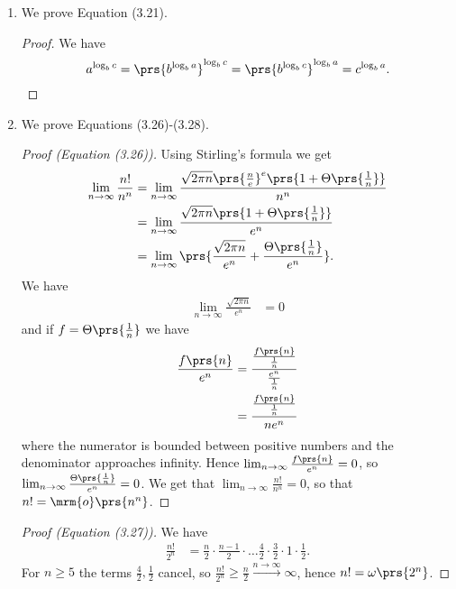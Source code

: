\documentclass[oneside]{scrbook}
\theoremstyle{definition}
\begin{document}
\begin{exercise}
    \begin{enumerate}[label = \alph*.]
        \item We prove Equation (3.21).

        \begin{proof}
            We have
            \[a^{\log_b c} = \prs{b^{\log_b a}}^{\log_b c} = \prs{b^{\log_b c}}^{\log_b a} = c^{\log_b a} \text{.}\]
        \end{proof}

        \item We prove Equations (3.26)-(3.28).

        \begin{proof}[Proof (Equation (3.26))]
            Using Stirling's formula we get
            \begin{align*}
                \lim_{n\to\infty} \frac{n!}{n^n}
                &=
                \lim_{n\to\infty} \frac{\sqrt{2 \pi n} \prs{\frac{n}{e}}^e \prs{1 + \Theta\prs{\frac{1}{n}}}}{n^n}
                \\
                &=
                \lim_{n\to\infty} \frac{\sqrt{2 \pi n} \prs{1 + \Theta\prs{\frac{1}{n}}}}{e^n}
                \\&=
                \lim_{n\to\infty} \prs{\frac{\sqrt{2 \pi n}}{e^n} + \frac{\Theta\prs{\frac{1}{n}}}{e^n}} \text{.}
            \end{align*}
            We have
            \begin{align*}
                \lim_{n\to\infty} \frac{\sqrt{2 \pi n}}{e^n} &= 0
            \end{align*}
            and if $f = \Theta\prs{\frac{1}{n}}$ we have
            \begin{align*}
                \frac{f\prs{n}}{e^n} &= \frac{\frac{f\prs{n}}{\frac{1}{n}}}{\frac{e^n}{\frac{1}{n}}}
                \\&=
                \frac{\frac{f\prs{n}}{\frac{1}{n}}}{n e^n}
            \end{align*}
            where the numerator is bounded between positive numbers and the denominator approaches infinity. Hence $\lim_{n\to\infty} \frac{f\prs{n}}{e^n} = 0$, so $\lim_{n\to\infty} \frac{\Theta\prs{\frac{1}{n}}}{e^n} = 0$.
            We get that
            $\lim_{n\to\infty} \frac{n!}{n^n} = 0$, so that $n! = \mrm{o}\prs{n^n}$.
        \end{proof}

        \begin{proof}[Proof (Equation (3.27))]
            We have
            \begin{align*}
                \frac{n!}{2^n} &= \frac{n}{2} \cdot \frac{n-1}{2} \cdot \ldots \frac{4}{2} \cdot \frac{3}{2} \cdot 1 \cdot \frac{1}{2} \text{.}
            \end{align*}
            For $n \geq 5$ the terms $\frac{4}{2}, \frac{1}{2}$ cancel, so $\frac{n!}{2^n} \geq \frac{n}{2} \xrightarrow{n\to\infty} \infty$, hence $n! = \omega\prs{2^n}$.
        \end{proof}


\end{enumerate}
\end{exercise}
\end{document}
